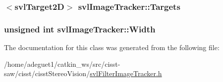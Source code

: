 \hypertarget{classsvl_image_tracker_acc589d98d13de77df8a2eed855df9d28}{
\subsubsection[{Targets}]{$<${\bf svl\-Target2\-D}$>$ svl\-Image\-Tracker\-::\-Targets\hspace{0.3cm}{\ttfamily [protected]}}}\label{classsvl_image_tracker_acc589d98d13de77df8a2eed855df9d28}
\hypertarget{classsvl_image_tracker_a6bad5bd6edbd63f8a350203afe26dea6}{
\subsubsection[{Width}]{\setlength{\rightskip}{0pt plus 5cm}unsigned int svl\-Image\-Tracker\-::\-Width\hspace{0.3cm}{\ttfamily [protected]}}}\label{classsvl_image_tracker_a6bad5bd6edbd63f8a350203afe26dea6}


The documentation for this class was generated from the following file\-:\begin{DoxyCompactItemize}
\item 
/home/adeguet1/catkin\-\_\-ws/src/cisst-\/saw/cisst/cisst\-Stereo\-Vision/\hyperlink{svl_filter_image_tracker_8h}{svl\-Filter\-Image\-Tracker.\-h}\end{DoxyCompactItemize}
